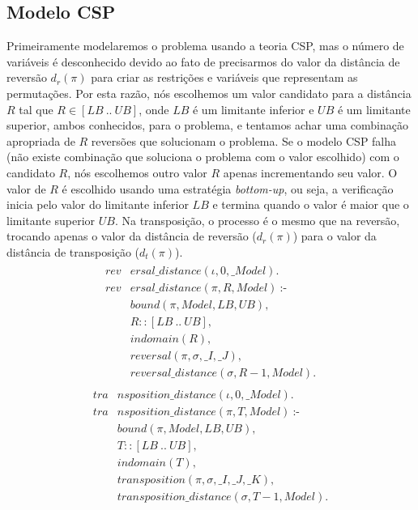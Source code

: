 \subsection{Modelo CSP}
\label{subsec:modelcsp}
Primeiramente modelaremos o problema usando a teoria CSP, mas o número
de variáveis é desconhecido devido ao fato de precisarmos do valor da
distância de reversão $d_{r}(\pi)$ para criar as restrições e
variáveis que representam as permutações. Por esta razão, nós
escolhemos um valor candidato para a distância $R$ tal que $R \in
[LB~..~UB]$, onde $LB$ é um limitante inferior e $UB$ é um limitante
superior, ambos conhecidos, para o problema, e tentamos achar uma
combinação apropriada de $R$ reversões que solucionam o problema. Se o
modelo CSP falha (não existe combinação que soluciona o problema com o
valor escolhido) com o candidato $R$, nós escolhemos outro valor $R$
apenas incrementando seu valor. O valor de $R$ é escolhido usando uma
estratégia \textit{bottom-up}, ou seja, a verificação inicia pelo
valor do limitante inferior $LB$ e termina quando o valor é maior que
o limitante superior $UB$. Na transposição, o processo é o mesmo que
na reversão, trocando apenas o valor da distância de reversão
($d_{r}(\pi)$) para o valor da distância de transposição
($d_{t}(\pi)$).
\begin{align}
  \label{revdistance}
  \begin{split}
  \textit{rev}&\textit{ersal\_distance}(\iota, 0, \_Model). \\
  \textit{rev}&\textit{ersal\_distance}(\pi, R, Model)~\text{:-} \\
  &\textit{bound}(\pi, Model, LB, UB), \\
  &R :: [LB~..~UB], \\
  &\textit{indomain}(R),  \\
  &\textit{reversal}(\pi, \sigma, \_I, \_J),  \\
  &\textit{reversal\_distance}(\sigma, R-1, Model). 
  \end{split}
\end{align}
\begin{align}
  \label{tradistance}
  \begin{split}
  \textit{tra}&\textit{nsposition\_distance}(\iota, 0, \_Model). \\
  \textit{tra}&\textit{nsposition\_distance}(\pi, T, Model)~\text{:-} \\
  &\textit{bound}(\pi, Model, LB, UB), \\
  &T :: [LB~..~UB], \\
  &\textit{indomain}(T),  \\
  &\textit{transposition}(\pi, \sigma, \_I, \_J, \_K),  \\
  &\textit{transposition\_distance}(\sigma, T-1, Model). 
  \end{split}
\end{align}

